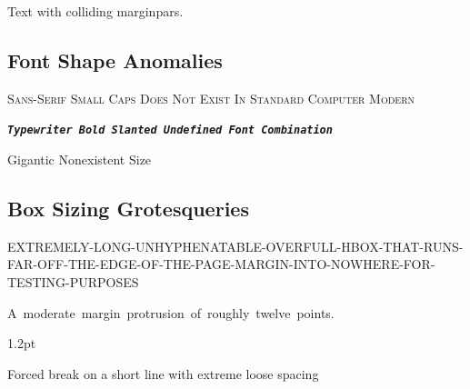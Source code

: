 \documentclass[11pt,unused_horror_option_flag]{article}
\begin{document}
Text with colliding marginpars.

\subsection{Font Shape Anomalies}

{\textsf{\textsc{Sans-Serif Small Caps Does Not Exist In Standard Computer Modern}}}

{\texttt{\textbf{\textsl{Typewriter Bold Slanted Undefined Font Combination}}}}

{\fontsize{99pt}{110pt}\selectfont Gigantic Nonexistent Size}

\subsection{Box Sizing Grotesqueries}

\noindent\mbox{EXTREMELY-LONG-UNHYPHENATABLE-OVERFULL-HBOX-THAT-RUNS-FAR-OFF-THE-EDGE-OF-THE-PAGE-MARGIN-INTO-NOWHERE-FOR-TESTING-PURPOSES}

\noindent\hspace{0.90\textwidth}\mbox{A moderate margin protrusion of roughly twelve points.}

\noindent\hspace{0.995\textwidth}\mbox{1.2pt}

Forced break on a short line with extreme loose spacing\linebreak
\end{document}
